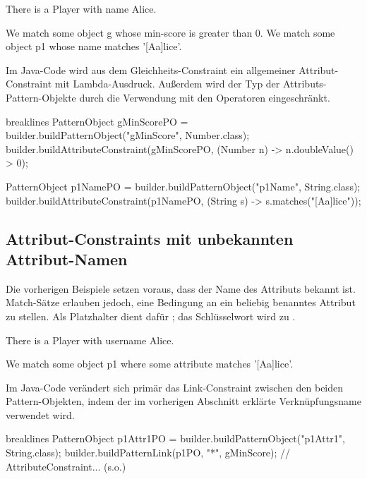 \begin{mdcodeblock}
    There is a Player with name Alice.

    We match some object g whose min-score is greater than 0.
    We match some object p1 whose name matches '[Aa]lice'.
\end{mdcodeblock}

Im Java-Code wird aus dem Gleichheits-Constraint ein allgemeiner Attribut-Constraint mit Lambda-Ausdruck.
Außerdem wird der Typ der Attributs-Pattern-Objekte durch die Verwendung mit den Operatoren eingeschränkt.

\begin{jcodeblock*}{breaklines}
    PatternObject gMinScorePO = builder.buildPatternObject("gMinScore", Number.class);
    builder.buildAttributeConstraint(gMinScorePO, (Number n) -> n.doubleValue() > 0);

    PatternObject p1NamePO = builder.buildPatternObject("p1Name", String.class);
    builder.buildAttributeConstraint(p1NamePO, (String s) -> s.matches("[Aa]lice"));
\end{jcodeblock*}

\subsection{Attribut-Constraints mit unbekannten Attribut-Namen}

Die vorherigen Beispiele setzen voraus, dass der Name des Attributs bekannt ist.
Match-Sätze erlauben jedoch, eine Bedingung an ein beliebig benanntes Attribut zu stellen.
Als Platzhalter dient dafür ;
das Schlüsselwort  wird zu .

\begin{mdcodeblock}
    There is a Player with username Alice.

    We match some object p1 where some attribute matches '[Aa]lice'.
\end{mdcodeblock}

Im Java-Code verändert sich primär das Link-Constraint zwischen den beiden Pattern-Objekten,
indem der im vorherigen Abschnitt erklärte Verknüpfungsname \code{*} verwendet wird.

\begin{jcodeblock*}{breaklines}
    PatternObject p1Attr1PO = builder.buildPatternObject("p1Attr1", String.class);
    builder.buildPatternLink(p1PO, "*", gMinScore);
    // AttributeConstraint... (s.o.)
\end{jcodeblock*}

